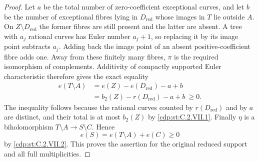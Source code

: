 \begin{proof}
Let $a$ be the total number of zero-coefficient
exceptional curves, and let $b$ be the number of
exceptional fibres lying in $D_{\mathrm{red}}$
whose images in $T$ lie outside $A$. On
$Z\setminus D_{\mathrm{red}}$ the former fibres
are still present and the latter are absent.
A tree with $a_j$ rational curves has Euler
number $a_j+1$, so replacing it by its image
point subtracts $a_j$. Adding back the image
point of an absent positive-coefficient fibre
adds one. Away from these finitely many fibres,
$\pi$ is the required isomorphism of complements.
Additivity of compactly supported Euler
characteristic therefore gives the exact equality
\[
 \begin{aligned}
 e(T\setminus A)
   &=e(Z)-e(D_{\mathrm{red}})-a+b\\
   &=b_2(Z)-r(D_{\mathrm{red}})-a+b
   \ \ge0 .
 \end{aligned}
\tag{C.VII.8}\label{cdp:eq:C.VII.8}
\]
The inequality follows because the rational curves
counted by $r(D_{\mathrm{red}})$ and by $a$ are
distinct, and their total is at most $b_2(Z)$ by
\ref{cdp:st:C.2.VII.1}.
Finally $\eta$ is a biholomorphism
$T\setminus A\to S\setminus C$. Hence
\[
 e(S)=e(T\setminus A)+e(C)\ge0
\]
by \ref{cdp:st:C.2.VII.2}. This proves the assertion for the
original reduced support and all full multiplicities.
\end{proof}


